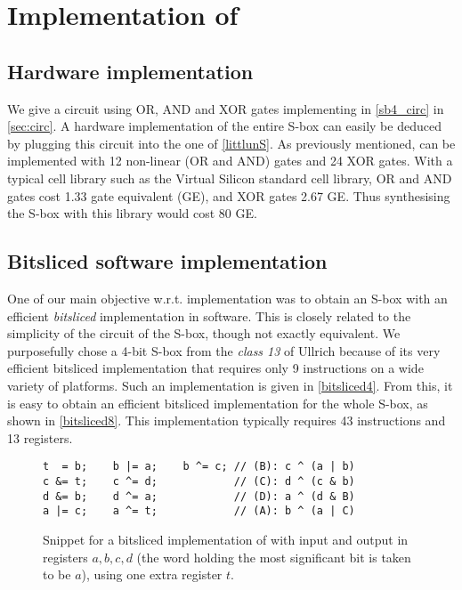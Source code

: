 \section{Implementation of \littlunOne}
\label{sec:implem}

\subsection{Hardware implementation}
We give a circuit using OR, AND and XOR gates implementing \littlunS in \autoref{sb4_circ} in \autoref{sec:circ}.
A hardware implementation of the entire S-box can easily be deduced by plugging this circuit into the one of \autoref{littlunS}.
As previously mentioned, \littlunOne can be implemented with 12 non-linear (OR and AND) gates and 24 XOR gates. With a typical cell library
such as the Virtual Silicon standard cell library, OR and AND gates cost 1.33 gate equivalent (GE), and XOR gates 2.67 GE. Thus synthesising
the S-box with this library would cost 80 GE. 

\subsection{Bitsliced software implementation}
One of our main objective w.r.t. implementation was to obtain an S-box with an efficient \emph{bitsliced} implementation in
software. This is closely related to the simplicity of the circuit of the S-box, though not exactly equivalent.
We purposefully chose a 4-bit S-box from the \emph{class 13} of Ullrich \etal \cite{skew} because of its very
efficient bitsliced implementation that requires only 9 instructions
on a wide variety of platforms.
Such an implementation is given in \autoref{bitsliced4}.
From this, it is easy to obtain an efficient bitsliced implementation for the whole S-box, as shown in \autoref{bitsliced8}.
This implementation typically requires 43 instructions and 13 registers.

\begin{figure}[ht]
\begin{verbatim}
t  = b;    b |= a;    b ^= c; // (B): c ^ (a | b)
c &= t;    c ^= d;            // (C): d ^ (c & b)
d &= b;    d ^= a;            // (D): a ^ (d & B)
a |= c;    a ^= t;            // (A): b ^ (a | C)
\end{verbatim}
\caption[Snippet for a bitsliced \C implementation of \littlunS.]{Snippet for a bitsliced \C implementation of \littlunS \label{bitsliced4} with input and output in registers $a,b,c,d$ (the word holding the most significant bit is taken to be $a$), using one extra register $t$.}
\end{figure}

